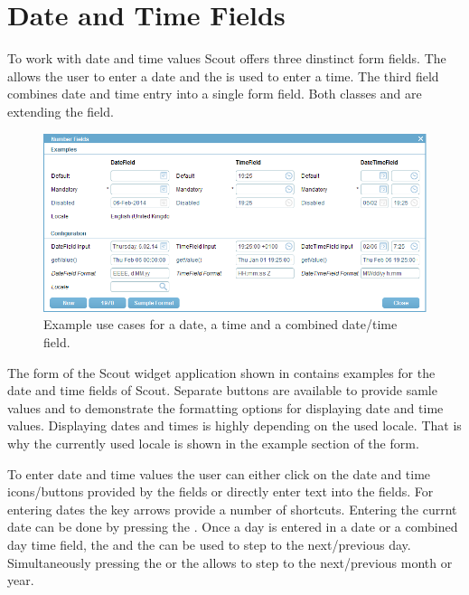 \documentclass[a4paper,10pt,twoside]{book}
\begin{document}
\section{Date and Time Fields}

To work with date and time values Scout offers three dinstinct form fields. 
The  allows the user to enter a date and the  is used to enter a time. 
The third field  combines date and time entry into a single form field. 
Both classes  and  are extending the  field.

\begin{figure}
\includegraphics[width=15cm]{datetimefield.png}
\caption{Example use cases for a date, a time and a combined date/time field.
}
\end{figure}

The form  of the Scout widget application shown in  contains examples for the date and time fields of Scout.
Separate buttons are available to provide samle values and to demonstrate the formatting options for displaying date and time values.
Displaying dates and times is highly depending on the used locale.
That is why the currently used locale is shown in the example section of the form.

To enter date and time values the user can either click on the date and time icons/buttons provided by the fields or directly enter text into the fields. 
For entering dates the key arrows provide a number of shortcuts. 
Entering the currnt date can be done by pressing the . 
Once a day is entered in a date or a combined day time field, the  and the  can be used to step to the next/previous day. 
Simultaneously pressing the  or the  allows to step to the next/previous month or year.
\end{document}

